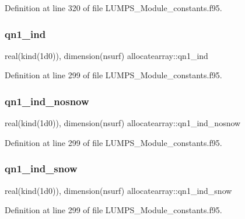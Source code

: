 Definition at line 320 of file L\+U\+M\+P\+S\+\_\+\+Module\+\_\+constants.\+f95.

\mbox{\label{namespaceallocatearray_ae1c8dcf595053e7c0c88f68acf975058}} 
\subsubsection{\texorpdfstring{qn1\+\_\+ind}{qn1\_ind}}
{\footnotesize\ttfamily real(kind(1d0)), dimension(nsurf) allocatearray\+::qn1\+\_\+ind}



Definition at line 299 of file L\+U\+M\+P\+S\+\_\+\+Module\+\_\+constants.\+f95.

\mbox{\label{namespaceallocatearray_a098df5ee70b2d0e75e10d6a2af40b6a2}} 
\subsubsection{\texorpdfstring{qn1\+\_\+ind\+\_\+nosnow}{qn1\_ind\_nosnow}}
{\footnotesize\ttfamily real(kind(1d0)), dimension(nsurf) allocatearray\+::qn1\+\_\+ind\+\_\+nosnow}



Definition at line 299 of file L\+U\+M\+P\+S\+\_\+\+Module\+\_\+constants.\+f95.

\mbox{\label{namespaceallocatearray_aa0f581ad59f5d12178c78ed717aa0cdf}} 
\subsubsection{\texorpdfstring{qn1\+\_\+ind\+\_\+snow}{qn1\_ind\_snow}}
{\footnotesize\ttfamily real(kind(1d0)), dimension(nsurf) allocatearray\+::qn1\+\_\+ind\+\_\+snow}



Definition at line 299 of file L\+U\+M\+P\+S\+\_\+\+Module\+\_\+constants.\+f95.


